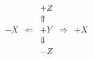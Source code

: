\documentclass{article}
\begin{document}
\pagecolor{green!20}
\huge \bf
\[
\begin{array}{ccccc}
  && +Z && \\
  &&\Uparrow && \\
-X & \Leftarrow & +Y & \Rightarrow & +X \\
  &&\Downarrow && \\
&& -Z && 
\end{array}
\]
\end{document}
